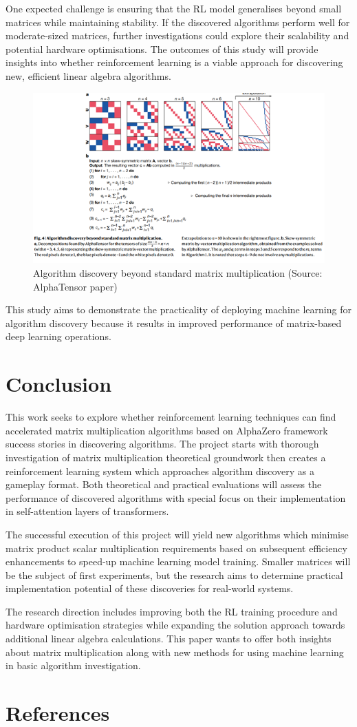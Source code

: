 \documentclass{article}
\begin{document}
One expected challenge is ensuring that the RL model generalises beyond small matrices while maintaining stability. If the discovered algorithms perform well for moderate-sized matrices, further investigations could explore their scalability and potential hardware optimisations. The outcomes of this study will provide insights into whether reinforcement learning is a viable approach for discovering new, efficient linear algebra algorithms.

\begin{figure}[H]
    \centering
    \includegraphics[width=0.6\linewidth]{Picture5.png}
    \caption{Algorithm discovery beyond standard matrix multiplication (Source: AlphaTensor paper)}
    \label{fig:standard-matrix}
\end{figure}

This study aims to demonstrate the practicality of deploying machine learning for algorithm discovery because it results in improved performance of matrix-based deep learning operations.

\section{Conclusion}
This work seeks to explore whether reinforcement learning techniques can find accelerated matrix multiplication algorithms based on AlphaZero framework success stories in discovering algorithms. The project starts with thorough investigation of matrix multiplication theoretical groundwork then creates a reinforcement learning system which approaches algorithm discovery as a gameplay format. Both theoretical and practical evaluations will assess the performance of discovered algorithms with special focus on their implementation in self-attention layers of transformers.

The successful execution of this project will yield new algorithms which minimise matrix product scalar multiplication requirements based on subsequent efficiency enhancements to speed-up machine learning model training. Smaller matrices will be the subject of first experiments, but the research aims to determine practical implementation potential of these discoveries for real-world systems.

The research direction includes improving both the RL training procedure and hardware optimisation strategies while expanding the solution approach towards additional linear algebra calculations. This paper wants to offer both insights about matrix multiplication along with new methods for using machine learning in basic algorithm investigation.

\section{References}
\printbibliography
\end{document}
